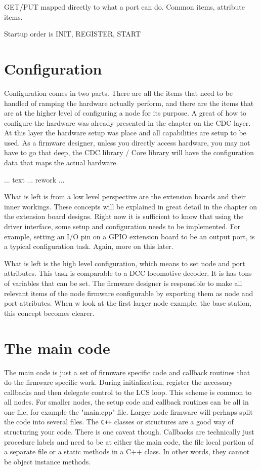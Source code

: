 GET/PUT mapped directly to what a port can do. Common items, attribute items. 

Startup order is INIT, REGISTER, START 



\section{Configuration}

Configuration comes in two parts. There are all the items that need to be handled of ramping the hardware actually perform, and there are the items that are at the higher level of configuring a node for its purpose. A great of how to configure the hardware was already presented in the chapter on the CDC layer. At this layer the hardware setup was place and all capabilities are setup to be used. As a firmware designer, unless you directly access hardware, you may not have to go that deep, the CDC library / Core library will have the configuration data that maps the actual hardware. 

... text ... rework ...

What is left is from a low level perspective are the extension boards and their inner workings. These concepts will be explained in great detail in the chapter on the extension board designs. Right now it is sufficient to know that using the driver interface, some setup and configuration needs to be implemented. For example, setting an I/O pin on a GPIO extension board to be an output port, is a typical configuration task. Again, more on this later.

What is left is the high level configuration, which means to set node and port attributes. This task is comparable to a DCC locomotive decoder. It is has tons of variables  that can be set. The firmware designer is responsible to make all relevant items of the node firmware configurable by exporting them as node and port attributes. When w look at the first larger node example, the base station, this concept becomes clearer.

\section{The main code}

The main code is just a set of firmware specific code and callback routines that do the firmware specific work. During initialization, register the necessary callbacks and then delegate control to the LCS loop. This scheme is common to all nodes. For smaller nodes, the setup code and callback routines can be all in one file, for example the "main.cpp" file. Larger node firmware will perhaps split the code into several files. The \texttt{C++} classes or structures are a good way of structuring your code. There is one caveat though. Callbacks are technically just procedure labels and need to be at either the main code, the file local portion of a separate file or a static methods in a C++ class. In other words, they cannot be object instance methods.

